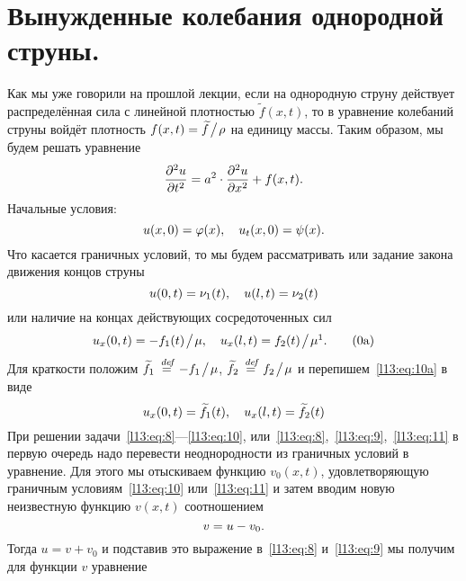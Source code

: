 \section{Вынужденные колебания однородной струны.}
\label{lecture13section2}
Как мы уже говорили на прошлой лекции, если на однородную струну действует распределённая сила с линейной плотностью $\widetilde{f}(x,t)$, то в уравнение колебаний струны войдёт плотность $f(x,t)=\widetilde{f}\!\bigm/\!\rho$ на единицу массы. Таким образом, мы будем решать уравнение 
\begin{equation}\label{l13:eq:8}
	\hfill\pdder{u}{t}=a^2\cdot\pdder{u}{x}+f(x,t).\hfill
\end{equation}
Начальные условия:
\begin{equation}\label{l13:eq:9}
	\hfill u(x,0)=\phi(x),\quad u_t(x,0)=\psi(x).\hfill
\end{equation}
Что касается граничных условий, то мы будем рассматривать или задание закона движения концов струны
\begin{equation}\label{l13:eq:10}
	\hfill u(0,t)=\nu_1(t),\quad u(l,t)=\nu_2(t)\hfill
\end{equation}
или наличие на концах действующих сосредоточенных сил
\begin{equation}\label{l13:eq:10a}
	\hfill u_x(0,t)=-f_1(t)\!\bigm/\!\mu,\quad u_x(l,t)=f_2(t)\!\bigm/\!\mu\footnotemark{}.\hfill\tag{\theequation a}
\end{equation} Для краткости положим $\widetilde{f}_1\stackrel{\hspace{0.09 cm}de\!f}{=} -f_1\!\bigm/\!\mu$, $\widetilde{f}_2\stackrel{\hspace{0.09 cm}de\!f}{=} f_2\!\bigm/\!\mu$ и перепишем~\eqref{l13:eq:10a} в виде
\begin{equation}\label{l13:eq:11}
	\hfill u_x(0,t)=\widetilde{f}_1(t),\quad u_x(l,t)=\widetilde{f}_2(t)\hfill
\end{equation}
При решении задачи~\eqref{l13:eq:8}---\eqref{l13:eq:10}, или~\eqref{l13:eq:8},~\eqref{l13:eq:9},~\eqref{l13:eq:11} в первую очередь надо перевести неоднородности из граничных условий в уравнение. Для этого мы отыскиваем функцию $v_0(x,t)$, удовлетворяющую граничным условиям~\eqref{l13:eq:10} или~\eqref{l13:eq:11}  и затем вводим новую неизвестную функцию $v(x,t)$ соотношением 
\begin{equation*}
	\hfill v=u-v_0.\hfill
\end{equation*}  
Тогда $u=v+v_0$ и подставив это выражение в~\eqref{l13:eq:8} и~\eqref{l13:eq:9} мы получим для функции $v$ уравнение 
